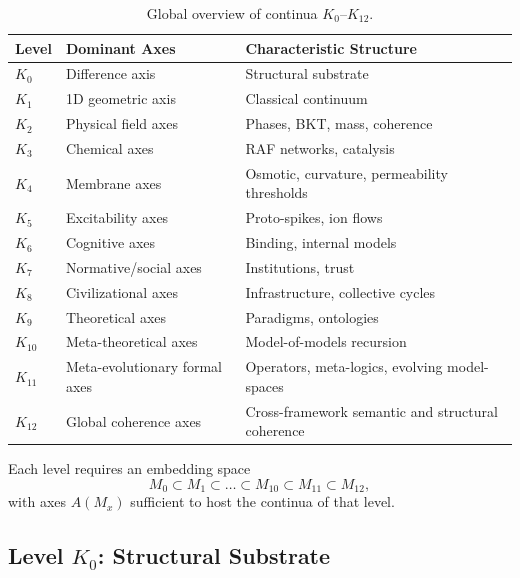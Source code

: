 \begin{table}[h!]
\centering
\begingroup
\footnotesize
\RaggedRight
\setlength{\tabcolsep}{4pt}
\begin{tabular}{@{}L{0.10\textwidth}L{0.25\textwidth}L{0.49\textwidth}@{}}
\hline
Level & Dominant Axes & Characteristic Structure \\
\hline
\(K_0\) & Difference axis & Structural substrate \\
\(K_1\) & 1D geometric axis & Classical continuum \\
\(K_2\) & Physical field axes & Phases, BKT, mass, coherence \\
\(K_3\) & Chemical axes & RAF networks, catalysis \\
\(K_4\) & Membrane axes & Osmotic, curvature, permeability thresholds \\
\(K_5\) & Excitability axes & Proto-spikes, ion flows \\
\(K_6\) & Cognitive axes & Binding, internal models \\
\(K_7\) & Normative/social axes & Institutions, trust \\
\(K_8\) & Civilizational axes & Infrastructure, collective cycles \\
\(K_9\) & Theoretical axes & Paradigms, ontologies \\
\(K_{10}\) & Meta-theoretical axes & Model-of-models recursion \\
\(K_{11}\) & Meta-evolutionary formal axes & Operators, meta-logics, evolving model-spaces \\
\(K_{12}\) & Global coherence axes & Cross-framework semantic and structural coherence \\
\hline
\end{tabular}
\endgroup
\caption{Global overview of continua \texorpdfstring{\(K_0\)}{K0}–\(K_{12}\).}
\label{tab:klevels-summary}
\end{table}

Each level requires an embedding space
\[
   M_0 \subset M_1 \subset \dots \subset M_{10} \subset M_{11} \subset M_{12},
\]
with axes \(A(M_x)\) sufficient to host the continua of that level.


\subsection{Level \texorpdfstring{\texorpdfstring{$K_0$}{K\_0}}{K0}: Structural Substrate}

